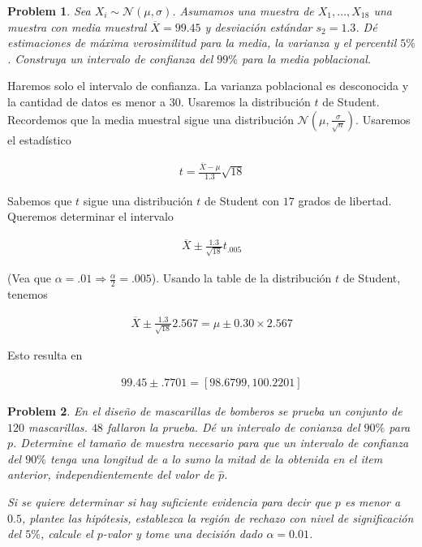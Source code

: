\documentclass[a4paper, 12pt]{article}
\newtheorem{problem}{Problem}
\newtheorem{problem}{Problem}
\begin{document}
\pagebreak 

\begin{problem}
    Sea $X_i \sim \mathcal{N}(\mu, \sigma)$. Asumamos una muestra de $X_1,
    \ldots, X_{18}$  una muestra con media muestral $\overline{X} = 99.45$ y
    desviación estándar $s_2 =
    1.3$. Dé estimaciones de máxima verosimilitud para la media, la varianza y
    el percentil $5\%$. Construya un intervalo de confianza del $99\%$ para la
    media poblacional.
\end{problem}

Haremos solo el intervalo de confianza. La varianza poblacional es desconocida y
la cantidad de datos es menor a $30$. Usaremos la distribución $t$ de Student.
Recordemos que la media muestral sigue una distribución $\mathcal{N}(\mu,
\frac{\sigma}{\sqrt{n} })$. Usaremos el estadístico

\begin{align*}
    t = \frac{\overline{X} - \mu}{1.3}\sqrt{18} 
\end{align*}

Sabemos que $t$ sigue una distribución $t$ de Student con $17$ grados de
libertad. Queremos determinar el intervalo 

\begin{align*}
    \overline{X} \pm \frac{1.3}{\sqrt{18} } t_{.005}
\end{align*}

(Vea que $\alpha = .01 \Rightarrow \frac{\alpha}{2} = .005$). Usando la table de
la distribución $t$ de Student, tenemos 

\begin{align*}
    \overline{X} \pm \frac{1.3}{\sqrt{18} } 2.567 = \mu \pm 0.30 \times 2.567
\end{align*}

Esto resulta en

\begin{align*}
    99.45 \pm .7701 = \left[ 98.6799, 100.2201 \right] 
\end{align*}

\pagebreak 

\begin{problem}
    En el diseño de mascarillas de bomberos se prueba un conjunto de $120$
    mascarillas. $48$ fallaron la prueba. Dé un intervalo de conianza del $90\%$
    para $p$. Determine el tamaño de muestra necesario para que un intervalo de
    confianza del $90\%$ tenga una longitud de a lo sumo la mitad de la obtenida
    en el item anterior, independientemente del valor de $\hat{p}$.

    Si se quiere determinar si hay suficiente evidencia para decir que $p$ es
    menor a $0.5$, plantee las hipótesis, establezca la región de rechazo con
    nivel de significación del $5\%$, calcule el $p$-valor y tome una decisión
    dado $\alpha = 0.01$.
\end{problem}
\end{document}
